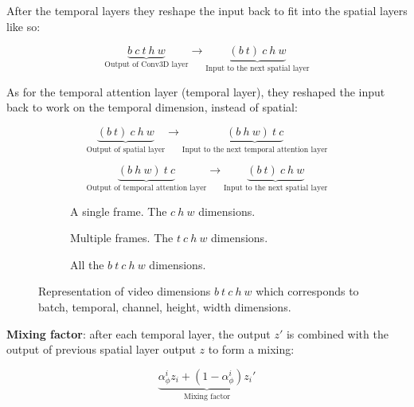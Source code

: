 After the temporal layers they reshape the input back to fit into the spatial layers like so:

\[ \underbrace{b\ c\ t\ h\ w}_{\text{Output of Conv3D layer}} \rightarrow \underbrace{(b\ t)\ c\ h\ w}_{\text{Input to the next spatial layer}} \]

As for the temporal attention layer (temporal layer), they reshaped the input back to work on the temporal dimension, instead of spatial:

\[ \underbrace{(b\ t)\ c\ h\ w}_{\text{Output of spatial layer}} \rightarrow \underbrace{(b\ h\ w) \ t\ c}_{\text{Input to the next temporal attention layer}} \]

\[ \underbrace{(b\ h\ w) \ t\ c}_{\text{Output of temporal attention layer}} \rightarrow \underbrace{(b\ t)\ c\ h\ w}_{\text{Input to the next spatial layer}} \]

\begin{figure}
    \centering

    \begin{subfigure}{0.3\textwidth}
        \centering
        \scalebox{0.5}{
            
        }
        \caption{A single frame. The $c\ h\ w$ dimensions.}
    \end{subfigure}

    \begin{subfigure}{0.3\textwidth}
        \centering
        \scalebox{0.5}{
            
        }
        \caption{Multiple frames. The $t\ c\ h\ w$ dimensions.}
    \end{subfigure}

    \begin{subfigure}{0.7\textwidth}
        \centering
        \scalebox{0.5}{
            
        }
        \caption{All the $b\ t\ c\ h\ w$ dimensions.}
    \end{subfigure}

    \caption{Representation of video dimensions $b\ t\ c\ h\ w$ which corresponds to batch, temporal, channel, height, width dimensions.}
\end{figure}





\textbf{Mixing factor}: after each temporal layer, the output $z'$ is combined with the output of previous spatial layer output $z$ to form a mixing: 

\[ \underbrace{\alpha_\phi^i z_{i} + (1 - \alpha_\phi^i) z_{i}'}_{\text{Mixing factor}} \] 

